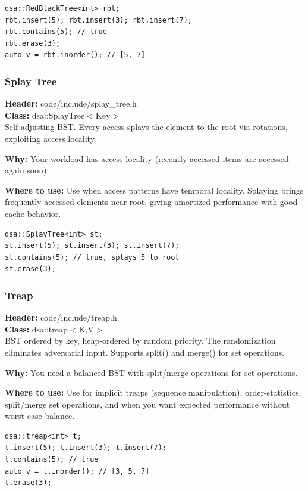 \documentclass[11pt]{article}
\begin{document}
\begin{lstlisting}
dsa::RedBlackTree<int> rbt;
rbt.insert(5); rbt.insert(3); rbt.insert(7);
rbt.contains(5); // true
rbt.erase(3);
auto v = rbt.inorder(); // [5, 7]
\end{lstlisting}

\subsubsection{Splay Tree}
\textbf{Header:} code/include/splay\_tree.h\\
\textbf{Class:} dsa::SplayTree$<$Key$>$\\

Self-adjusting BST. Every access splays the element to the root via rotations, exploiting access locality.

\textbf{Why:} Your workload has access locality (recently accessed items are accessed again soon). \par \textbf{Where to use:} Use when access patterns have temporal locality. Splaying brings frequently accessed elements near root, giving amortized performance with good cache behavior.

\begin{lstlisting}
dsa::SplayTree<int> st;
st.insert(5); st.insert(3); st.insert(7);
st.contains(5); // true, splays 5 to root
st.erase(3);
\end{lstlisting}

\subsubsection{Treap}
\textbf{Header:} code/include/treap.h\\
\textbf{Class:} dsa::treap$<$K,V$>$\\

BST ordered by key, heap-ordered by random priority. The randomization eliminates adversarial input. Supports split() and merge() for set operations.

\textbf{Why:} You need a balanced BST with split/merge operations for set operations. \par \textbf{Where to use:} Use for implicit treaps (sequence manipulation), order-statistics, split/merge set operations, and when you want expected performance without worst-case balance.

\begin{lstlisting}
dsa::treap<int> t;
t.insert(5); t.insert(3); t.insert(7);
t.contains(5); // true
auto v = t.inorder(); // [3, 5, 7]
t.erase(3);
\end{lstlisting}
\end{document}
